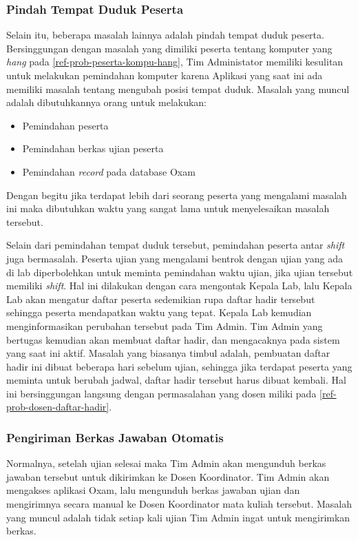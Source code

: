     \subsubsection{Pindah Tempat Duduk Peserta}\label{ref-prob-admin-pindah}
    Selain itu, beberapa masalah lainnya adalah pindah tempat duduk peserta. Bersinggungan dengan masalah yang dimiliki peserta tentang komputer yang \textit{hang} pada \ref{ref-prob-peserta-kompu-hang}, Tim Administator memiliki kesulitan untuk melakukan pemindahan komputer karena Aplikasi yang saat ini ada memiliki masalah tentang mengubah posisi tempat duduk. Masalah yang muncul adalah dibutuhkannya orang untuk melakukan:
    \begin{itemize}
        \item Pemindahan peserta
        \item Pemindahan berkas ujian peserta
        \item Pemindahan \textit{record} pada database Oxam
    \end{itemize}

    Dengan begitu jika terdapat lebih dari seorang peserta yang mengalami masalah ini maka dibutuhkan waktu yang sangat lama untuk menyelesaikan masalah tersebut.
    
    Selain dari pemindahan tempat duduk tersebut, pemindahan peserta antar \textit{shift} juga bermasalah. Peserta ujian yang mengalami bentrok dengan ujian yang ada di lab diperbolehkan untuk meminta pemindahan waktu ujian, jika ujian tersebut memiliki \textit{shift}. Hal ini dilakukan dengan cara mengontak Kepala Lab, lalu Kepala Lab akan mengatur daftar peserta sedemikian rupa daftar hadir tersebut sehingga peserta mendapatkan waktu yang tepat. Kepala Lab kemudian menginformasikan perubahan tersebut pada Tim Admin. Tim Admin yang bertugas kemudian akan membuat daftar hadir, dan mengacaknya pada sistem yang saat ini aktif. Masalah yang biasanya timbul adalah, pembuatan daftar hadir ini dibuat beberapa hari sebelum ujian, sehingga jika terdapat peserta yang meminta untuk berubah jadwal, daftar hadir tersebut harus dibuat kembali. Hal ini bersinggungan langsung dengan permasalahan yang dosen miliki pada \ref{ref-prob-dosen-daftar-hadir}.

    \subsubsection{Pengiriman Berkas Jawaban Otomatis}\label{ref-prob-admin-pengiriman-berkas}
    Normalnya, setelah ujian selesai maka Tim Admin akan mengunduh berkas jawaban tersebut untuk dikirimkan ke Dosen Koordinator. Tim Admin akan mengakses aplikasi Oxam, lalu mengunduh berkas jawaban ujian dan mengirimnya secara manual ke Dosen Koordinator mata kuliah tersebut. Masalah yang muncul adalah tidak setiap kali ujian Tim Admin ingat untuk mengirimkan berkas.
    
